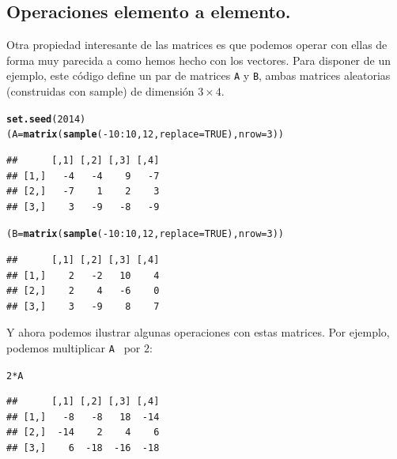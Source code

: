 \documentclass[10pt,a4paper]{article}\usepackage[]{graphicx}\usepackage[]{color}
\makeatletter
\newcommand{\hlnum}[1]{\textcolor[rgb]{0.686,0.059,0.569}{#1}}%
\newcommand{\hlopt}[1]{\textcolor[rgb]{0,0,0}{#1}}%
\newcommand{\hlstd}[1]{\textcolor[rgb]{0.345,0.345,0.345}{#1}}%
\newcommand{\hlkwb}[1]{\textcolor[rgb]{0.69,0.353,0.396}{#1}}%
\newcommand{\hlkwc}[1]{\textcolor[rgb]{0.333,0.667,0.333}{#1}}%
\newcommand{\hlkwd}[1]{\textcolor[rgb]{0.737,0.353,0.396}{\textbf{#1}}}%
\newenvironment{kframe}{%
 \def\at@end@of@kframe{}%
 \ifinner\ifhmode%
  \def\at@end@of@kframe{\end{minipage}}%
  \begin{minipage}{\columnwidth}%
 \fi\fi%
 \def\FrameCommand##1{\hskip\@totalleftmargin \hskip-\fboxsep
 \colorbox{shadecolor}{##1}\hskip-\fboxsep
     \hskip-\linewidth \hskip-\@totalleftmargin \hskip\columnwidth}%
 \MakeFramed {\advance\hsize-\width
   \@totalleftmargin\z@ \linewidth\hsize
   \@setminipage}}%
 {\par\unskip\endMakeFramed%
 \at@end@of@kframe}
\newenvironment{knitrout}{}{} %
\makeatother
\begin{document}
\subsection{Operaciones elemento a elemento.}
\label{tut03:subsec:OperacionesElementoAElementoMatrices}


Otra propiedad interesante de las matrices es que podemos operar con ellas de forma muy parecida a como hemos hecho con los vectores. Para disponer de un ejemplo, este código define un par de matrices {\tt A} y {\tt B}, ambas matrices aleatorias (construidas con sample) de dimensión $3\times 4$.
\begin{knitrout}
\color{fgcolor}\begin{kframe}
\begin{alltt}
     \hlkwd{set.seed}\hlstd{(}\hlnum{2014}\hlstd{)}
\hlstd{(A} \hlkwb{=} \hlkwd{matrix}\hlstd{(}\hlkwd{sample}\hlstd{(}\hlopt{-}\hlnum{10}\hlopt{:}\hlnum{10}\hlstd{,} \hlnum{12}\hlstd{,} \hlkwc{replace}\hlstd{=}\hlnum{TRUE}\hlstd{),} \hlkwc{nrow}\hlstd{=}\hlnum{3}\hlstd{))}
\end{alltt}
\begin{verbatim}
##      [,1] [,2] [,3] [,4]
## [1,]   -4   -4    9   -7
## [2,]   -7    1    2    3
## [3,]    3   -9   -8   -9
\end{verbatim}
\begin{alltt}
\hlstd{(B} \hlkwb{=} \hlkwd{matrix}\hlstd{(}\hlkwd{sample}\hlstd{(}\hlopt{-}\hlnum{10}\hlopt{:}\hlnum{10}\hlstd{,} \hlnum{12}\hlstd{,} \hlkwc{replace}\hlstd{=}\hlnum{TRUE}\hlstd{),} \hlkwc{nrow}\hlstd{=}\hlnum{3}\hlstd{))}
\end{alltt}
\begin{verbatim}
##      [,1] [,2] [,3] [,4]
## [1,]    2   -2   10    4
## [2,]    2    4   -6    0
## [3,]    3   -9    8    7
\end{verbatim}
\end{kframe}
\end{knitrout}
     Y ahora podemos ilustrar algunas operaciones con estas matrices. Por ejemplo, podemos multiplicar {\tt A } por $2$:
\begin{knitrout}
\color{fgcolor}\begin{kframe}
\begin{alltt}
\hlnum{2} \hlopt{*} \hlstd{A}
\end{alltt}
\begin{verbatim}
##      [,1] [,2] [,3] [,4]
## [1,]   -8   -8   18  -14
## [2,]  -14    2    4    6
## [3,]    6  -18  -16  -18
\end{verbatim}
\end{kframe}
\end{knitrout}
\end{document}
